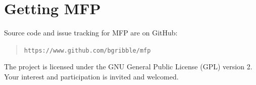\documentclass[11pt,a4paper]{article}
\begin{document}
\section{Getting MFP}

Source code and issue tracking for MFP are on GitHub:

\begin{quote}
\texttt{https://www.github.com/bgribble/mfp}
\end{quote}

The project is licensed under the GNU General Public License (GPL) version
2.   Your interest and participation is invited and welcomed.


%
%
%
%


%

\end{document}
